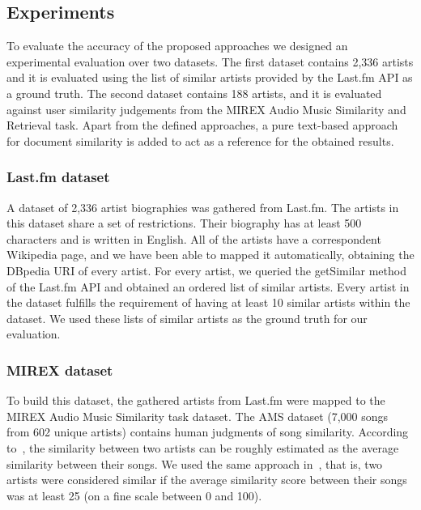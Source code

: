 \subsection{Experiments}
\label{sec:similarity:experimentalsetup}

To evaluate the accuracy of the proposed approaches we designed an experimental evaluation over two datasets. The first dataset contains 2,336 artists and it is evaluated using the list of similar artists provided by the Last.fm API as a ground truth. The second dataset contains 188 artists, and it is evaluated against user similarity judgements from the MIREX Audio Music Similarity and Retrieval task.
Apart from the defined approaches, a pure text-based approach for document similarity is added to act as a reference for the obtained results.


\subsubsection{Last.fm dataset}\label{sec:similarity:lastfm_dataset}

A dataset of 2,336 artist biographies was gathered from Last.fm. The artists in this dataset share a set of restrictions.
Their biography has at least 500 characters and is written in English.
All of the artists have a correspondent Wikipedia page, and we have been able to mapped it automatically, obtaining the DBpedia URI of every artist.
For every artist, we queried the getSimilar method of the Last.fm API and obtained an ordered list of similar artists. Every artist in the dataset fulfills the requirement of having at least 10 similar artists within the dataset.
We used these lists of similar artists as the ground truth for our evaluation.

\subsubsection{MIREX dataset} %

To build this dataset, the gathered artists from Last.fm
were mapped to the MIREX Audio Music Similarity task dataset. The AMS dataset (7,000 songs from 602 unique artists) contains human judgments of song similarity. According to~\cite{Schedl2013}, the similarity between two artists can be roughly estimated as the average similarity between their songs. We used the same approach in~\cite{Schedl2013}, that is, two artists were considered similar if the average similarity score between their songs was at least 25 (on a fine scale between 0 and 100).

